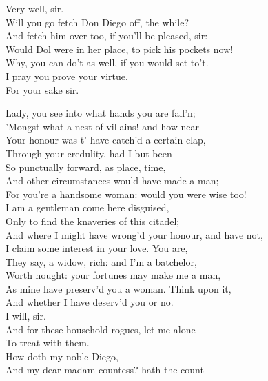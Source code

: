 \documentclass[a4paper,oneside]{memoir}
\begin{document}
\begin{drama*}
\facespeaks {} Very well, sir.\\
Will you go fetch Don Diego off, the while?\\
\subtlespeaks And fetch him over too, if you'll be pleased, sir:\\
Would Dol were in her place, to pick his pockets now!\\
\facespeaks Why, you can do't as well, if you would set to't.\\
I pray you prove your virtue.\\
\subtlespeaks {} For your sake sir.\\
\scene

\surlyspeaks Lady, you see into what hands you are fall'n;\\
'Mongst what a nest of villains! and how near\\
Your honour was t' have catch'd a certain clap,\\
Through your credulity, had I but been\\
So punctually forward, as place, time,\\
And other circumstances would have made a man;\\
For you're a handsome woman: would you were wise too!\\
I am a gentleman come here disguised,\\
Only to find the knaveries of this citadel;\\
And where I might have wrong'd your honour, and have not,\\
I claim some interest in your love. You are,\\
They say, a widow, rich: and I'm a batchelor,\\
Worth nought: your fortunes may make me a man,\\
As mine have preserv'd you a woman. Think upon it,\\
And whether I have deserv'd you or no.\\
\pliantspeaks {} I will, sir.\\
\surlyspeaks And for these household-rogues, let me alone\\
To treat with them.\\
\subtlespeaks {} How doth my noble Diego,\\
And my dear madam countess? hath the count\\

\end{drama*}
\end{document}

